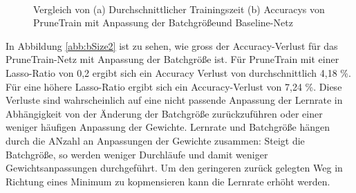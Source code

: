  \begin{figure}
     \centering
     \hfill
     \\
     \caption{Vergleich von (a) Durchschnittlicher Trainingszeit (b) Accuracys von PruneTrain mit Anpassung der Batchgrößeund Baseline-Netz}
     \label{abb:bSize}
\end{figure}

In Abbildung \ref{abb:bSize2} ist zu sehen, wie gross der Accuracy-Verlust für das PruneTrain-Netz mit Anpassung der Batchgröße ist. Für PruneTrain mit einer Lasso-Ratio von 0,2 ergibt sich ein Accuracy Verlust von durchschnittlich 4,18 \%. Für eine höhere Lasso-Ratio ergibt sich ein Accuracy-Verlust von 7,24 \%. Diese Verluste sind wahrscheinlich auf eine nicht passende Anpassung der Lernrate in Abhängigkeit von der Änderung der Batchgröße zurückzuführen oder einer weniger häufigen Anpassung der Gewichte. Lernrate und Batchgröße hängen durch die ANzahl an Anpassungen der Gewichte zusammen: Steigt die Batchgröße, so werden weniger Durchläufe und damit weniger Gewichtsanpassungen durchgeführt. Um den geringeren zurück gelegten Weg in Richtung eines Minimum zu kopmensieren kann die Lernrate erhöht werden.











